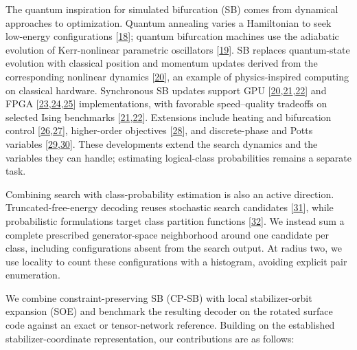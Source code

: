 \documentclass[
  10pt,
]{article}
\begin{document}
The quantum inspiration for simulated bifurcation (SB) comes from
dynamical approaches to optimization. Quantum annealing varies a
Hamiltonian to seek low-energy configurations {[}\hyperlink{ref:18}{18}{]}; quantum
bifurcation machines use the adiabatic evolution of Kerr-nonlinear
parametric oscillators {[}\hyperlink{ref:19}{19}{]}. SB replaces quantum-state evolution
with classical position and momentum updates derived from the
corresponding nonlinear dynamics {[}\hyperlink{ref:20}{20}{]}, an example of
physics-inspired computing on classical hardware. Synchronous SB updates
support GPU {[}\hyperlink{ref:20}{20},\hyperlink{ref:21}{21},\hyperlink{ref:22}{22}{]} and FPGA {[}\hyperlink{ref:23}{23},\hyperlink{ref:24}{24},\hyperlink{ref:25}{25}{]} implementations, with
favorable speed--quality tradeoffs on selected Ising benchmarks
{[}\hyperlink{ref:21}{21},\hyperlink{ref:22}{22}{]}. Extensions include heating and bifurcation control
{[}\hyperlink{ref:26}{26},\hyperlink{ref:27}{27}{]}, higher-order objectives {[}\hyperlink{ref:28}{28}{]}, and discrete-phase and
Potts variables {[}\hyperlink{ref:29}{29},\hyperlink{ref:30}{30}{]}. These developments extend the search
dynamics and the variables they can handle; estimating logical-class
probabilities remains a separate task.

Combining search with class-probability estimation is also an active
direction. Truncated-free-energy decoding reuses stochastic search
candidates {[}\hyperlink{ref:31}{31}{]}, while probabilistic formulations target class
partition functions {[}\hyperlink{ref:32}{32}{]}. We instead sum a complete prescribed
generator-space neighborhood around one candidate per class, including
configurations absent from the search output. At radius two, we use
locality to count these configurations with a histogram, avoiding
explicit pair enumeration.

We combine constraint-preserving SB (CP-SB) with local stabilizer-orbit
expansion (SOE) and benchmark the resulting decoder on the rotated
surface code against an exact or tensor-network reference. Building on
the established stabilizer-coordinate representation, our contributions
are as follows:
\end{document}

